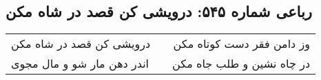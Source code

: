 \begin{center}
\section*{رباعی شماره ۵۴۵: درویشی کن قصد در شاه مکن}
\label{sec:sh545}
\begin{longtable}{l p{0.5cm} r}
درویشی کن قصد در شاه مکن
&&
وز دامن فقر دست کوتاه مکن
\\
اندر دهن مار شو و مال مجوی
&&
در چاه نشین و طلب جاه مکن
\\
\end{longtable}
\end{center}
